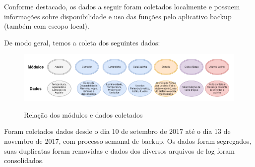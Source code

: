 Conforme destacado, os dados a seguir foram coletados localmente e possuem informações sobre disponibilidade e uso das funções pelo aplicativo backup (também com escopo local).

De modo geral, temos a coleta dos seguintes dados:

\begin{figure}[H]
	\centering
	\caption{Relação dos módulos e dados coletados}
	\includegraphics[width=1.0\textwidth]{DiagramaModulosDados}
	\label{fig:DiagramaModulosDados}
\end{figure}

Foram coletados dados desde o dia 10 de setembro de 2017 até o dia 13 de novembro de 2017, com processo semanal de backup. Os dados foram segregados, suas duplicatas foram removidas e dados dos diversos arquivos de log foram consolidados.

